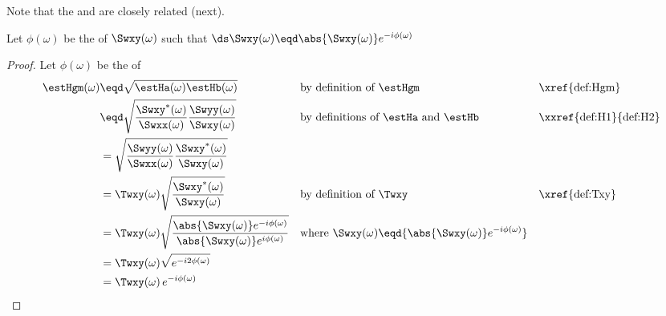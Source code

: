Note that the   and  
are closely related (next).
\begin{proposition}
\label{prop:HgmTxy_mag}
Let $\phi(\omega)$ be the  of $\Swxy(\omega)$ such that
$\ds\Swxy(\omega) \eqd \abs{\Swxy(\omega)}e^{-i\phi(\omega)}$
\\
\end{proposition}
\begin{proof}
Let $\phi(\omega)$ be the  of
\begin{align*}
  \estHgm(\omega)
    &\eqd \sqrt{\estHa(\omega)\estHb(\omega)}
    && \text{by definition of $\estHgm$}
    && \text{\xref{def:Hgm}}
  \\&\eqd \sqrt{\frac{\Swxy^\ast(\omega)}{\Swxx(\omega)}\frac{\Swyy(\omega)}{\Swxy(\omega)}}
    && \text{by definitions of $\estHa$ and $\estHb$}
    && \text{\xxref{def:H1}{def:H2}}
  \\&= \sqrt{\frac{\Swyy(\omega)}{\Swxx(\omega)}\frac{\Swxy^\ast(\omega)}{\Swxy(\omega)}}
  \\&= \Twxy(\omega)\sqrt{\frac{\Swxy^\ast(\omega)}{\Swxy(\omega)}}
    && \text{by definition of $\Twxy$}
    && \text{\xref{def:Txy}}
  \\&= \Twxy(\omega)\sqrt{\frac{\abs{\Swxy(\omega)}e^{-i\phi(\omega)}}{\abs{\Swxy(\omega)}e^{i\phi(\omega)}}}
    && \text{where $\Swxy(\omega)\eqd{\abs{\Swxy(\omega)}e^{-i\phi(\omega)}}$}
  \\&= \Twxy(\omega)\sqrt{e^{-i2\phi(\omega)}}
  \\&= \Twxy(\omega)\,e^{-i\phi(\omega)}
\end{align*}
\end{proof}

